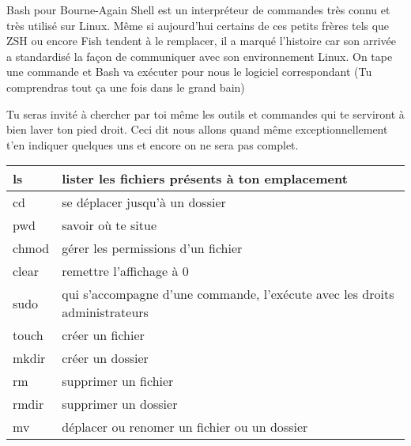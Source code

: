\documentclass[a4paper, 12pt]{article}
\begin{document}
{\comfortaa

    Bash pour Bourne-Again Shell est un interpréteur de commandes très connu et très utilisé sur Linux. Même si aujourd'hui
    certains de ces petits frères tels que ZSH ou encore Fish tendent à le remplacer, il a marqué l'histoire car
    son arrivée a standardisé la façon de communiquer avec son environnement Linux.
    \newline \newline
    On tape une commande et Bash va exécuter pour nous le logiciel correspondant
    (Tu comprendras tout ça une fois dans le grand bain)

    \vspace{0.6cm}

    Tu seras invité à chercher par toi même les outils et commandes
    qui te serviront à bien laver ton pied droit. Ceci dit nous allons
    quand même
    \newline
    exceptionnellement t'en indiquer quelques uns et encore
    on ne sera pas complet.

    
    \begin{tabular}{|p{2cm}|p{14cm}|} 
        \hline
        ls & lister les fichiers présents à ton emplacement \\
        \hline
        cd & se déplacer jusqu'à un dossier \\
        \hline
        pwd & savoir où te situe \\
        \hline
        chmod & gérer les permissions d'un fichier \\
        \hline
        clear & remettre l'affichage à 0 \\
        \hline
        sudo & qui s'accompagne d'une commande, l'exécute avec les droits administrateurs \\
        \hline
        touch & créer un fichier \\
        \hline
        mkdir & créer un dossier \\
        \hline
        rm & supprimer un fichier \\
        \hline
        rmdir & supprimer un dossier \\
        \hline
        mv & déplacer ou renomer un fichier ou un dossier \\
        \hline
    \end{tabular}

}
\end{document}
